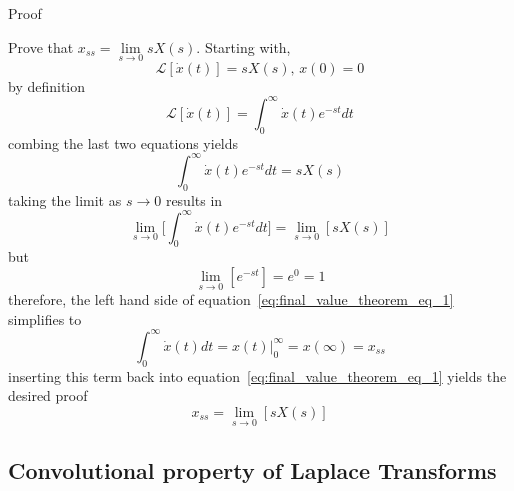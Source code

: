\documentclass[12pt,letter]{article}
\numberwithin{ex}{section} %
\numberwithin{re}{section} %
\newcommand{\gr}[1]{\textcolor[rgb]{0.00,0.50,0.00}{#1}}
\newcommand{\Laplace}[1]{\ensuremath{\mathcal{L}{\left[#1\right]}}}
\numberwithin{equation}{section}	%
\begin{document}
\begin{mdframed}[middlelinewidth=0.5mm]
\begin{center}
\gr{Proof}
\end{center}

Prove that $x_{ss} = \lim\limits_{s\rightarrow 0} s X(s)$. Starting with, 
\begin{equation}
\Laplace{\dot{x}(t)} = s X(s)\text{, } x(0)=0
\end{equation}
by definition
\begin{equation}
\Laplace{\dot{x}(t)} = \int_0^{\infty} \dot{x}(t)e^{-s t}dt
\end{equation}
combing the last two equations yields
\begin{equation}
\int_0^{\infty} \dot{x}(t)e^{-s t}dt = s X(s)
\end{equation}
taking the limit as $s \rightarrow 0$ results in 
\begin{equation}
\lim\limits_{s \rightarrow 0} \bigg[ \int_0^{\infty} \dot{x}(t)e^{-s t}dt \bigg] = \lim\limits_{s \rightarrow 0}[s X(s)]
\label{eq:final_value_theorem_eq_1}
\end{equation}
but
\begin{equation}
\lim\limits_{s \rightarrow 0} [ e^{-s t}] = e^0 = 1
\end{equation}
therefore, the left hand side of equation~\ref{eq:final_value_theorem_eq_1} simplifies to 
\begin{equation}
\int_0^{\infty} \dot{x}(t)dt = x(t)  \big|_{0}^{\infty} = x(\infty) = x_{ss}
\end{equation}
inserting this term back into equation~\ref{eq:final_value_theorem_eq_1} yields the desired proof
\begin{equation}
x_{ss} =  \lim\limits_{s\rightarrow 0} [s X(s)]
\end{equation}

\end{mdframed}


\subsection{Convolutional property of Laplace Transforms}
\end{document}
